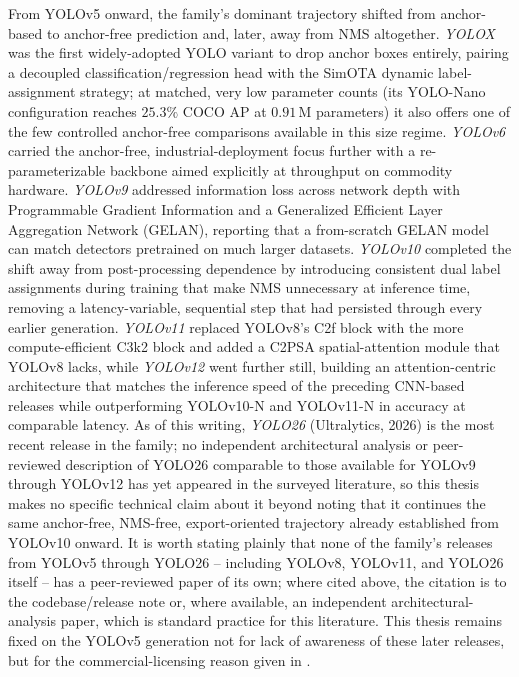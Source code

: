 From YOLOv5 onward, the family's dominant trajectory shifted from anchor-based to anchor-free prediction and, later, away from NMS altogether. \textit{YOLOX} \cite{geYOLOXExceedingYOLO2021} was the first widely-adopted YOLO variant to drop anchor boxes entirely, pairing a decoupled classification/regression head with the SimOTA dynamic label-assignment strategy; at matched, very low parameter counts (its YOLO-Nano configuration reaches $25.3\%$ COCO AP at $0.91\,\mathrm{M}$ parameters) it also offers one of the few controlled anchor-free comparisons available in this size regime. \textit{YOLOv6} \cite{liYOLOv6SingleStageObject2022} carried the anchor-free, industrial-deployment focus further with a re-parameterizable backbone aimed explicitly at throughput on commodity hardware. \textit{YOLOv9} \cite{wangYOLOv9LearningWhat2025} addressed information loss across network depth with Programmable Gradient Information and a Generalized Efficient Layer Aggregation Network (GELAN), reporting that a from-scratch GELAN model can match detectors pretrained on much larger datasets. \textit{YOLOv10} \cite{wangYOLOv10RealTimeEndtoEnd2024} completed the shift away from post-processing dependence by introducing consistent dual label assignments during training that make NMS unnecessary at inference time, removing a latency-variable, sequential step that had persisted through every earlier generation. \textit{YOLOv11} \cite{khanamYOLOv11OverviewKey2024} replaced YOLOv8's C2f block with the more compute-efficient C3k2 block and added a C2PSA spatial-attention module that YOLOv8 lacks, while \textit{YOLOv12} \cite{tianYOLOv12AttentionCentricRealTime2025} went further still, building an attention-centric architecture that matches the inference speed of the preceding CNN-based releases while outperforming YOLOv10-N and YOLOv11-N in accuracy at comparable latency. As of this writing, \textit{YOLO26} (Ultralytics, 2026) is the most recent release in the family; no independent architectural analysis or peer-reviewed description of YOLO26 comparable to those available for YOLOv9 through YOLOv12 has yet appeared in the surveyed literature, so this thesis makes no specific technical claim about it beyond noting that it continues the same anchor-free, NMS-free, export-oriented trajectory already established from YOLOv10 onward. It is worth stating plainly that none of the family's releases from YOLOv5 through YOLO26 -- including YOLOv8, YOLOv11, and YOLO26 itself -- has a peer-reviewed paper of its own; where cited above, the citation is to the codebase/release note or, where available, an independent architectural-analysis paper, which is standard practice for this literature. This thesis remains fixed on the YOLOv5 generation not for lack of awareness of these later releases, but for the commercial-licensing reason given in .

